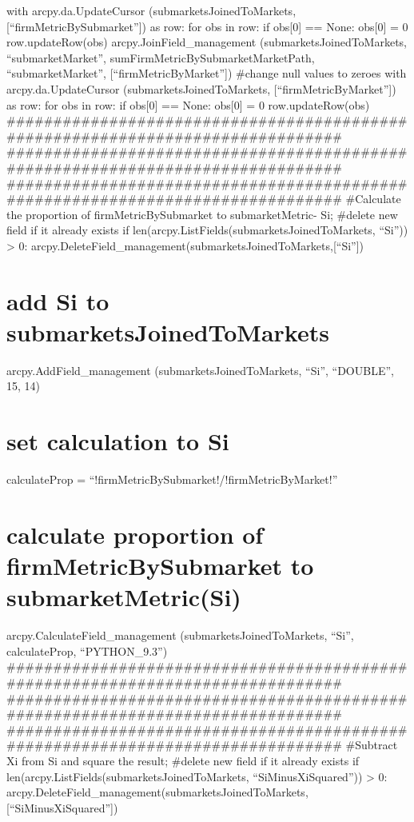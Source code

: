 \documentclass[]{article}
\begin{document}
with arcpy.da.UpdateCursor (submarketsJoinedToMarkets,
{[}``firmMetricBySubmarket''{]}) as row: for obs in row: if obs{[}0{]}
== None: obs{[}0{]} = 0 row.updateRow(obs) arcpy.JoinField\_management
(submarketsJoinedToMarkets, ``submarketMarket'',
sumFirmMetricBySubmarketMarketPath, ``submarketMarket'',
{[}``firmMetricByMarket''{]}) \#change null values to zeroes with
arcpy.da.UpdateCursor (submarketsJoinedToMarkets,
{[}``firmMetricByMarket''{]}) as row: for obs in row: if obs{[}0{]} ==
None: obs{[}0{]} = 0 row.updateRow(obs)
\#\#\#\#\#\#\#\#\#\#\#\#\#\#\#\#\#\#\#\#\#\#\#\#\#\#\#\#\#\#\#\#\#\#\#\#\#\#\#\#\#\#\#\#\#\#\#\#\#\#\#\#\#\#\#\#\#\#\#\#\#\#\#\#\#\#\#\#\#\#\#\#\#\#\#\#\#\#\#
\#\#\#\#\#\#\#\#\#\#\#\#\#\#\#\#\#\#\#\#\#\#\#\#\#\#\#\#\#\#\#\#\#\#\#\#\#\#\#\#\#\#\#\#\#\#\#\#\#\#\#\#\#\#\#\#\#\#\#\#\#\#\#\#\#\#\#\#\#\#\#\#\#\#\#\#\#\#\#
\#\#\#\#\#\#\#\#\#\#\#\#\#\#\#\#\#\#\#\#\#\#\#\#\#\#\#\#\#\#\#\#\#\#\#\#\#\#\#\#\#\#\#\#\#\#\#\#\#\#\#\#\#\#\#\#\#\#\#\#\#\#\#\#\#\#\#\#\#\#\#\#\#\#\#\#\#\#\#
\#Calculate the proportion of firmMetricBySubmarket to submarketMetric-
Si; \#delete new field if it already exists if
len(arcpy.ListFields(submarketsJoinedToMarkets, ``Si'')) \textgreater{}
0: arcpy.DeleteField\_management(submarketsJoinedToMarkets,{[}``Si''{]})

\section{add Si to
submarketsJoinedToMarkets}\label{add-si-to-submarketsjoinedtomarkets}

arcpy.AddField\_management (submarketsJoinedToMarkets, ``Si'',
``DOUBLE'', 15, 14)

\section{set calculation to Si}\label{set-calculation-to-si}

calculateProp = ``!firmMetricBySubmarket!/!firmMetricByMarket!''

\section{calculate proportion of firmMetricBySubmarket to
submarketMetric(Si)}\label{calculate-proportion-of-firmmetricbysubmarket-to-submarketmetricsi}

arcpy.CalculateField\_management (submarketsJoinedToMarkets, ``Si'',
calculateProp, ``PYTHON\_9.3'')
\#\#\#\#\#\#\#\#\#\#\#\#\#\#\#\#\#\#\#\#\#\#\#\#\#\#\#\#\#\#\#\#\#\#\#\#\#\#\#\#\#\#\#\#\#\#\#\#\#\#\#\#\#\#\#\#\#\#\#\#\#\#\#\#\#\#\#\#\#\#\#\#\#\#\#\#\#\#\#
\#\#\#\#\#\#\#\#\#\#\#\#\#\#\#\#\#\#\#\#\#\#\#\#\#\#\#\#\#\#\#\#\#\#\#\#\#\#\#\#\#\#\#\#\#\#\#\#\#\#\#\#\#\#\#\#\#\#\#\#\#\#\#\#\#\#\#\#\#\#\#\#\#\#\#\#\#\#\#
\#\#\#\#\#\#\#\#\#\#\#\#\#\#\#\#\#\#\#\#\#\#\#\#\#\#\#\#\#\#\#\#\#\#\#\#\#\#\#\#\#\#\#\#\#\#\#\#\#\#\#\#\#\#\#\#\#\#\#\#\#\#\#\#\#\#\#\#\#\#\#\#\#\#\#\#\#\#\#
\#Subtract Xi from Si and square the result; \#delete new field if it
already exists if len(arcpy.ListFields(submarketsJoinedToMarkets,
``SiMinusXiSquared'')) \textgreater{} 0:
arcpy.DeleteField\_management(submarketsJoinedToMarkets,{[}``SiMinusXiSquared''{]})
\end{document}
